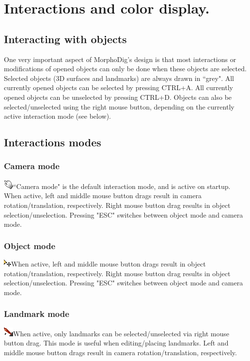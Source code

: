 \chapter{Interactions and color display. }
\minitoc  


\section{Interacting with objects}
One very important aspect of MorphoDig's design is that most interactions or modifications of opened objects can only be done when these objects are selected. 
Selected objects (3D surfaces and landmarks) are always drawn in ``grey". All currently opened objects can be selected by pressing CTRL+A. All currently opened objects can be unselected by pressing CTRL+D. Objects can also be selected/unselected using the right mouse button, depending on the currently active interaction mode (see below).



\section{Interactions modes}


\subsection{Camera mode}
  \includegraphics[scale=0.7]{images/04/camera_mode.png}``Camera mode" is the default interaction mode, and is active on startup. When active, left and middle mouse button drags result in camera rotation/translation, respectively. Right mouse button drag results in object selection/unselection. Pressing "ESC" switches between object mode and camera mode.
\subsection{Object mode}
   \includegraphics[scale=0.7]{images/04/move_mode.png}When active, left and middle mouse button drags result in object rotation/translation, respectively. Right mouse button drag results in object selection/unselection. Pressing "ESC" switches between object mode and camera mode.
\subsection{Landmark mode}
  \includegraphics[scale=0.7]{images/04/Landmarks2.png}When active, only landmarks can be selected/unselected via right mouse button drag. This mode is useful when editing/placing landmarks. Left and middle mouse button drags result in camera rotation/translation, respectively.

